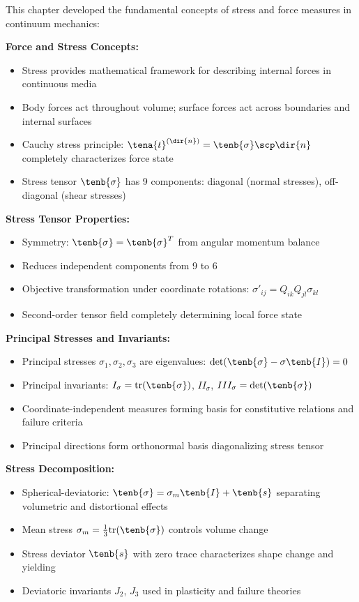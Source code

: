\begin{subox}[Summary]
This chapter developed the fundamental concepts of stress and force measures in continuum mechanics:

\textbf{Force and Stress Concepts:}
\begin{itemize}
\item Stress provides mathematical framework for describing internal forces in continuous media
\item Body forces act throughout volume; surface forces act across boundaries and internal surfaces
\item Cauchy stress principle: $\tena{t}^{(\dir{n})} = \tenb{\sigma} \scp \dir{n}$ completely characterizes force state
\item Stress tensor $\tenb{\sigma}$ has 9 components: diagonal (normal stresses), off-diagonal (shear stresses)
\end{itemize}

\textbf{Stress Tensor Properties:}
\begin{itemize}
\item Symmetry: $\tenb{\sigma} = \tenb{\sigma}^T$ from angular momentum balance
\item Reduces independent components from 9 to 6
\item Objective transformation under coordinate rotations: $\sigma'_{ij} = Q_{ik}Q_{jl}\sigma_{kl}$
\item Second-order tensor field completely determining local force state
\end{itemize}

\textbf{Principal Stresses and Invariants:}
\begin{itemize}
\item Principal stresses $\sigma_1, \sigma_2, \sigma_3$ are eigenvalues: $\det(\tenb{\sigma} - \sigma \tenb{I}) = 0$
\item Principal invariants: $I_\sigma = \text{tr}(\tenb{\sigma})$, $II_\sigma$, $III_\sigma = \det(\tenb{\sigma})$
\item Coordinate-independent measures forming basis for constitutive relations and failure criteria
\item Principal directions form orthonormal basis diagonalizing stress tensor
\end{itemize}

\textbf{Stress Decomposition:}
\begin{itemize}
\item Spherical-deviatoric: $\tenb{\sigma} = \sigma_m \tenb{I} + \tenb{s}$ separating volumetric and distortional effects
\item Mean stress $\sigma_m = \frac{1}{3}\text{tr}(\tenb{\sigma})$ controls volume change
\item Stress deviator $\tenb{s}$ with zero trace characterizes shape change and yielding
\item Deviatoric invariants $J_2$, $J_3$ used in plasticity and failure theories
\end{itemize}


\end{subox}
